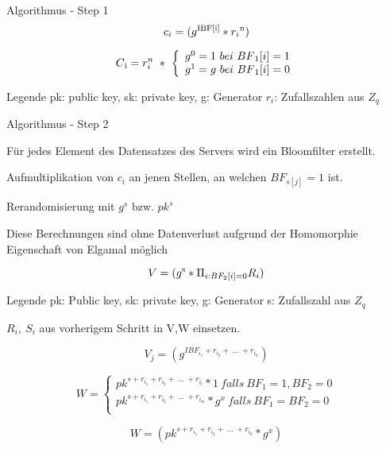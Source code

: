 \documentclass{beamer}
\begin{document}
	\begin{frame}{Algorithmus - Step 1}
		$$c_i = (g \textsuperscript{IBF[i]}  * r_{i}\textsuperscript{n})$$
		
		
		\[
		C\textsubscript{i} = r_{i}^{n} \ * \ \left\{
		\begin{array}{ll}
		g^{0} = 1 \ bei \  BF\textsubscript{1}[i]=1\\
		g^{1} = g \ bei \ BF\textsubscript{1}[i]=0\\
		\end{array}
		\right.
		\]
		
		\begin{block}{Legende}
			pk: public key, sk: private key, g: Generator $r_i$: Zufallszahlen aus $Z_q$ 
		\end{block}
		
	\end{frame}
	
	\begin{frame}{Algorithmus - Step 2}
		
		\begin{arrowlist}
			\item Für jedes Element des Datensatzes des Servers wird ein Bloomfilter erstellt.
			\item Aufmultiplikation  von $c_i$  an jenen Stellen, an welchen $BF_{s[j]}= 1$ ist.
			\item Rerandomisierung mit $g^s$ bzw. $pk^s$ 
			\item Diese Berechnungen sind ohne Datenverlust aufgrund der Homomorphie Eigenschaft von Elgamal möglich
		\end{arrowlist}	
		$$ V = (g \textsuperscript{s} * \Pi_{i:BF_{2}[i] = 0} R_{i} )$$
		
		
		\begin{block}{Legende}
			pk: Public key, sk: private key, g: Generator s: Zufallszahl aus $Z_q$
		\end{block}
		
	\end{frame}
	
	\begin{frame}
		\begin{arrowlist}
			\item 	 $R_{i}, \  S_{i}$ aus vorherigem Schritt in V,W einsetzen.
			
		\end{arrowlist}
		
		$$ V_{j} = (g^{ IBF_{i_{1}} + r_{i_{2}} + \ ...\ +r_{i_{k}}})$$
		
		\[
		W =\left\{
		\begin{array}{ll}
		pk^{s + r_{i_{1}} + r_{i_{2}} + \ ...\ +r_{i_{l}}}*1 \ falls \ BF_{1} = 1,BF_{2} = 0 \\
		pk^{s + r_{i_{1}} + r_{i_{2}} + \ ...\ +r_{i_{m}}}*g^{x} \ falls \ BF_{1} = BF_{2} = 0\\
		\end{array}
		\right.
		\]
		
		$$ W= (pk^{s + r_{i_{1}} + r_{i_{2}} + \ ...\ +r_{i_{k}}}* g^x)$$
		
	\end{frame}
	
\end{document}
